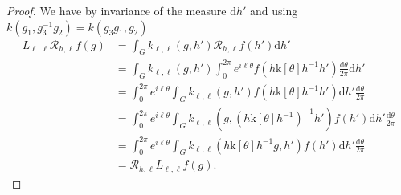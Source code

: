 \documentclass[12pt]{amsart}
\theoremstyle{definition}
\theoremstyle{remark}
\numberwithin{equation}{section}
\newcommand{\1}{{\mathbf 1}}
\renewcommand{\d}{\mathrm d}
\begin{document}
\begin{proof}
    We have by invariance of the measure $\d h'$ and using $k(g_1,g_3^{-1}g_2) = k(g_3 g_1 ,g_2)$
    \begin{align*}
        L_{\ell,\ell}  \mathcal{R}_{h,\ell} f(g)&=\int_{G} k_{\ell,\ell}(g,h')\mathcal{R}_{h,\ell} f(h')\d h'\\
        &=\int_{G} k_{\ell,\ell}(g,h') \int_0^{2\pi} e^{i\ell\theta}f(h \mathrm{k}[\theta] h^{-1} h')\frac{\d \theta}{2\pi} \d h'\\
&=\int_0^{2\pi} e^{i\ell\theta}\int_{G} k_{\ell,\ell}(g,h') f(h \mathrm{k}[\theta] h^{-1} h') \d h' \frac{\d \theta}{2\pi}\\
        &= \int_0^{2\pi}  e^{i\ell\theta}\int_{G}k_{\ell,\ell}(g,(h \mathrm{k}[\theta] h^{-1})^{-1}h') f(h')  \d h' \frac{\d \theta}{2\pi}\\
        &=\int_0^{2\pi}  e^{i\ell\theta} \int_{G}  k_{\ell,\ell}(h \mathrm{k}[\theta] h^{-1} g,h') f(h')  \d h' \frac{\d \theta}{2\pi}\\
        &=\mathcal{R}_{h,\ell} 
 L_{\ell,\ell}f(g).
    \end{align*}
\end{proof}
\end{document}
